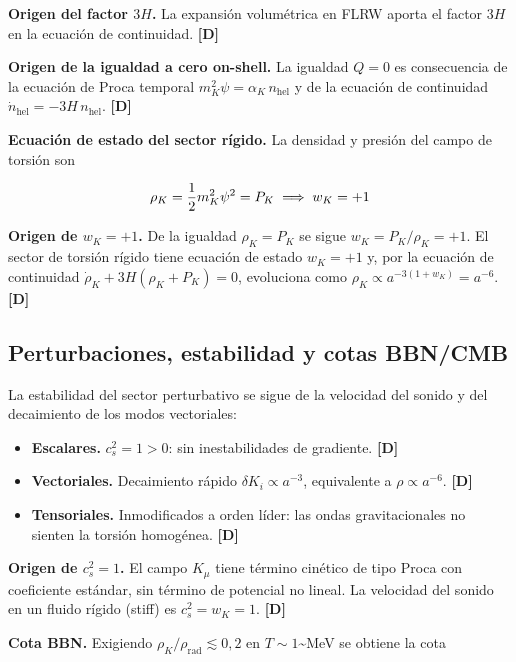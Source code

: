 ﻿\documentclass[11pt,letterpaper]{article}
\begin{document}
\textbf{Origen del factor $3H$.} La expansión volumétrica en FLRW aporta el factor $3H$ en la ecuación de continuidad. \textbf{[D]}

\textbf{Origen de la igualdad a cero on-shell.} La igualdad $Q = 0$ es consecuencia de la ecuación de Proca temporal $m_K^2\psi = \alpha_K\,n_{\text{hel}}$ y de la ecuación de continuidad $\dot n_{\text{hel}} = -3H\,n_{\text{hel}}$. \textbf{[D]}

\textbf{Ecuación de estado del sector rígido.} La densidad y presión del campo de torsión son

\begin{equation*}
  \resizebox{\ifdim\width>\linewidth \linewidth\else\width\fi}{!}{$\displaystyle \rho_K = \frac{1}{2}m_K^2\psi^2 = P_K \implies w_K = +1$}
\end{equation*}

\textbf{Origen de $w_K = +1$.} De la igualdad $\rho_K = P_K$ se sigue $w_K = P_K/\rho_K = +1$. El sector de torsión rígido tiene ecuación de estado $w_K = +1$ y, por la ecuación de continuidad $\dot\rho_K + 3H(\rho_K + P_K) = 0$, evoluciona como $\rho_K \propto a^{-3(1+w_K)} = a^{-6}$. \textbf{[D]}
\subsection{Perturbaciones, estabilidad y cotas BBN/CMB}
La estabilidad del sector perturbativo se sigue de la velocidad del sonido y del decaimiento de los modos vectoriales:

\begin{itemize}[leftmargin=*]
\item \textbf{Escalares.} $c_s^2 = 1 > 0$: sin inestabilidades de gradiente. \textbf{[D]}
\item \textbf{Vectoriales.} Decaimiento rápido $\delta K_i \propto a^{-3}$, equivalente a $\rho \propto a^{-6}$. \textbf{[D]}
\item \textbf{Tensoriales.} Inmodificados a orden líder: las ondas gravitacionales no sienten la torsión homogénea. \textbf{[D]}
\end{itemize}

\textbf{Origen de $c_s^2 = 1$.} El campo $K_\mu$ tiene término cinético de tipo Proca con coeficiente estándar, sin término de potencial no lineal. La velocidad del sonido en un fluido rígido (stiff) es $c_s^2 = w_K = 1$. \textbf{[D]}

\textbf{Cota BBN.} Exigiendo $\rho_K/\rho_{\text{rad}} \lesssim 0{,}2$ en $T \sim 1$\textasciitilde{}MeV se obtiene la cota
\end{document}
